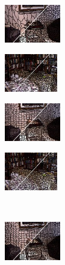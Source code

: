 \begin{figure}
\begin{subfigure}[b]{0.02\textwidth}
    \end{subfigure}
    \begin{subfigure}[b]{0.1375\textwidth}
        \includegraphics[height=1.65cm]{pictures/nyuv2/vccs/cropped/vccs_00001297_contours}
    \end{subfigure}
    \begin{subfigure}[b]{0.129\textwidth}
        \includegraphics[height=1.65cm]{pictures/sunrgbd/vccs/cropped/vccs_00007477_contours}
    \end{subfigure}
    \begin{subfigure}[b]{0.02\textwidth}
    \end{subfigure}
    \begin{subfigure}[b]{0.1375\textwidth}
        \includegraphics[height=1.65cm]{pictures/nyuv2/cw/cropped/cw_00001297_contours}
    \end{subfigure}
    \begin{subfigure}[b]{0.129\textwidth}
        \includegraphics[height=1.65cm]{pictures/sunrgbd/cw/cropped/cw_00007477_contours}
    \end{subfigure}\\
    \begin{subfigure}[b]{0.02\textwidth}
    \end{subfigure}
    \begin{subfigure}[b]{0.1375\textwidth}
        \includegraphics[height=1.65cm]{pictures/nyuv2/ergc/cropped/ergc_00001297_contours}

\end{subfigure}
\end{figure}
